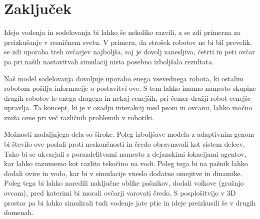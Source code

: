 \section{Zaključek}

Idejo vodenja in sodelovanja bi lahko še nekoliko razvili, a se zdi primerna za preizkušanje v resničnem svetu. V primeru, da strošek robotov ne bi bil prevelik, se zdi uporaba treh ovčarjev najboljša, saj je dovolj zanesljiva, četrti in peti ovčar pa pri naših nastavitvah simulacij nista posebno izboljšala rezultata.

Naš model sodelovanja dovoljuje uporabo enega vsevednega robota, ki ostalim robotom pošilja informacije o postavitvi ovc. S tem lahko imamo namesto skupine dragih robotov le enega dragega in nekaj cenejših, pri čemer dražji robot cenejše upravlja. Ta koncept, ki je v ozadju interakcij med psom in ovcami, lahko močno zniža cene pri več različnih problemih v robotiki.

Možnosti nadaljnjega dela so široke. Poleg izboljšave modela z adaptivnim genom bi število ovc poslali proti neskončnosti in čredo obravnavali kot sistem delcev. Tako bi se ukvarjali s porazdelitvami namesto z dejanskimi lokacijami agentov, kar lahko razumemo kot razlito tekočino na vodi. Poleg tega bi na pašnik lahko dodali ovire in vodo, kar bi v simulacije vneslo dodatne omejitve in dinamike. Poleg tega bi lahko naredili naključne oblike pašnikov, dodali volkove (grožnjo ovcam), pred katerimi bi morali ovčarji varovati čredo. S posplošitvijo v 3D prostor pa bi lahko simulirali tudi vodenje jate ptic in ideje preizkusili še v drugih domenah.
